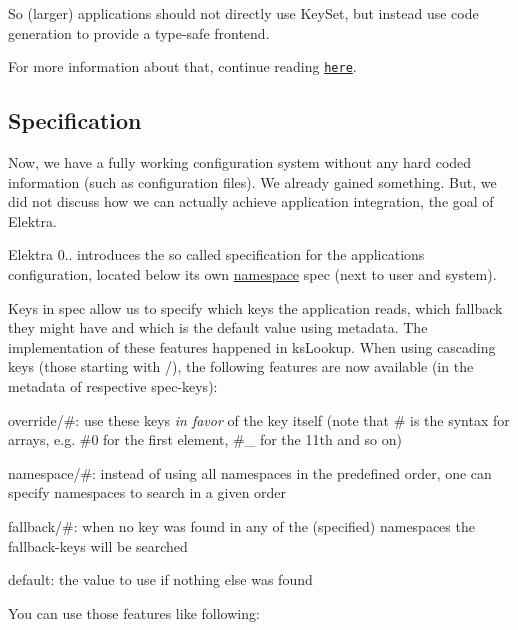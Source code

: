 So (larger) applications should not directly use {\ttfamily Key\+Set}, but instead use code generation to provide a type-\/safe frontend.

For more information about that, continue reading \href{https://github.com/ElektraInitiative/libelektra/tree/master/src/tools/gen}{\tt here}.

\subsection*{Specification}

Now, we have a fully working configuration system without any hard coded information (such as configuration files). We already gained something. But, we did not discuss how we can actually achieve application integration, the goal of Elektra.

Elektra 0.. introduces the so called specification for the application\textquotesingle{}s configuration, located below its own \hyperlink{md_doc_help_elektra-namespaces_doc_help_elektra-namespaces_md}{namespace} {\ttfamily spec} (next to user and system).

Keys in {\ttfamily spec} allow us to specify which keys the application reads, which fallback they might have and which is the default value using metadata. The implementation of these features happened in {\ttfamily ks\+Lookup}. When using cascading keys (those starting with {\ttfamily /}), the following features are now available (in the metadata of respective {\ttfamily spec}-\/keys)\+:


\begin{DoxyItemize}
\item {\ttfamily override/\#}\+: use these keys {\itshape in favor} of the key itself (note that {\ttfamily \#} is the syntax for arrays, e.\+g. {\ttfamily \#0} for the first element, {\ttfamily \#\+\_} for the 11th and so on)
\item {\ttfamily namespace/\#}\+: instead of using all namespaces in the predefined order, one can specify namespaces to search in a given order
\item {\ttfamily fallback/\#}\+: when no key was found in any of the (specified) namespaces the {\ttfamily fallback}-\/keys will be searched
\item {\ttfamily default}\+: the value to use if nothing else was found
\end{DoxyItemize}

You can use those features like following\+:


